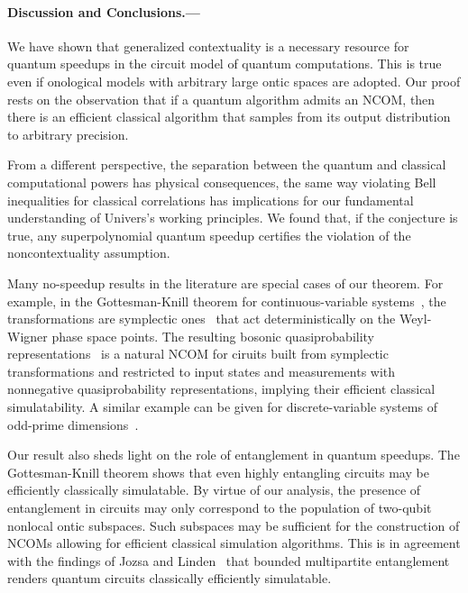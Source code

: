 \documentclass[prl,twocolumn,amsmath,amssymb,nofootinbib]{revtex4-1}
\begin{document}

\paragraph*{Discussion and Conclusions.---}

We have shown that generalized contextuality is a necessary resource for quantum speedups in the circuit model of quantum computations.
This is true even if onological models with arbitrary large ontic spaces are adopted.
Our proof rests on the observation that if a quantum algorithm admits an NCOM, then there is an efficient classical algorithm that samples from its output distribution to arbitrary precision.

From a different perspective, the separation between the quantum and classical computational powers has physical consequences, the same way violating Bell inequalities for classical correlations has implications for our fundamental understanding of Univers’s working principles.
We found that, if the conjecture is true, any superpolynomial quantum speedup certifies the violation of the noncontextuality assumption.

Many no-speedup results in the literature are special cases of our theorem.
For example, in the Gottesman-Knill theorem for continuous-variable systems~\cite{Bartlett2002,Bartlett2003}, the transformations are symplectic ones~\cite{Simon1994} that act deterministically on the Weyl-Wigner phase space points.
The resulting bosonic quasiprobability representations~\cite{GlauberBook} is a natural NCOM for ciruits
built from symplectic transformations and restricted to input states and measurements with nonnegative quasiprobability representations, implying their efficient classical simulatability.
A similar example can be given for discrete-variable systems of odd-prime dimensions~\cite{GrossThesis,Howard2014}. 

Our result also sheds light on the role of entanglement in quantum speedups.
The Gottesman-Knill theorem shows that even highly entangling circuits may be efficiently classically simulatable.
By virtue of our analysis, the presence of entanglement in circuits may only correspond to the population of two-qubit nonlocal ontic subspaces.
Such subspaces may be sufficient for the construction of NCOMs allowing for efficient classical simulation algorithms.
This is in agreement with the findings of Jozsa and Linden~\cite{Jozsa2003} that bounded multipartite entanglement renders quantum circuits classically efficiently simulatable.
\end{document}
